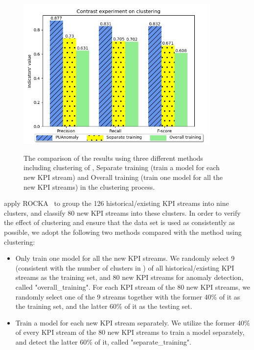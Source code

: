 \begin{figure}
  \begin{minipage}[h]{1.0\linewidth}
  \centering
  \includegraphics[width=0.9\textwidth]{ADS_Journal/PU figures/clustering with hatch.png}\\
  \end{minipage}
  \caption{The comparison of the results using three different methods including clustering of \name{}, Separate training (train a model for each new KPI stream) and Overall training (train one model for all the new KPI streams) in the clustering process.}
  \label{fig:whether_clustering_or_not}
\end{figure}

\name{} apply ROCKA~\cite{lirobust} to group the 126 historical/existing KPI streams into nine clusters, and classify 80 new KPI streams into these clusters. 
In order to verify the effect of clustering and ensure that the data set is used as consistently as possible, we adopt the following two methods compared with the method using clustering:
\begin{itemize}
  \item  
  Only train one model for all the new KPI streams. We randomly select 9 (consistent with the number of clusters in \name{}) of all historical/existing KPI streams as the training set, and 80 new KPI streams for anomaly detection, called "overall\_training". For each KPI stream of the 80 new KPI streams, we randomly select one of the 9 streams together with the former 40\% of it as the training set, and the latter 60\% of it as the testing set.
  \item 
  Train a model for each new KPI stream separately. We utilize the former 40\% of every KPI stream of the 80 new KPI streams to train a model separately, and detect the latter 60\% of it, called "separate\_training".
\end{itemize}

